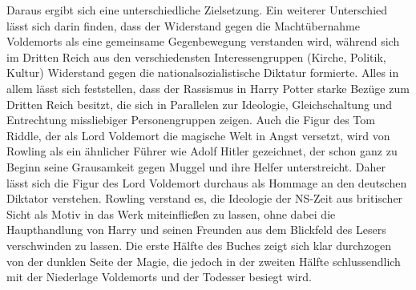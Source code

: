 Daraus ergibt sich eine unterschiedliche Zielsetzung.
Ein weiterer Unterschied lässt sich darin finden, dass der Widerstand gegen die Machtübernahme Voldemorts als eine gemeinsame Gegenbewegung verstanden wird, während sich im Dritten Reich aus den verschiedensten Interessengruppen (Kirche, Politik, Kultur) Widerstand gegen die nationalsozialistische Diktatur formierte.
Alles in allem lässt sich feststellen, dass der Rassismus in \glqq Harry Potter\grqq{} starke Bezüge zum Dritten Reich besitzt, die sich in Parallelen zur Ideologie, Gleichschaltung und Entrechtung missliebiger Personengruppen zeigen.
Auch die Figur des Tom Riddle, der als Lord Voldemort die magische Welt in Angst versetzt, wird von Rowling als ein ähnlicher \glqq Führer\grqq{} wie Adolf Hitler gezeichnet, der schon ganz zu Beginn seine Grausamkeit gegen Muggel und ihre Helfer unterstreicht.
Daher lässt sich die Figur des Lord Voldemort durchaus als Hommage an den deutschen Diktator verstehen.
Rowling verstand es, die Ideologie der NS-Zeit aus britischer Sicht als Motiv in das Werk miteinfließen zu lassen, ohne dabei die Haupthandlung von Harry und seinen Freunden aus dem Blickfeld des Lesers verschwinden zu lassen. 
Die erste Hälfte des Buches zeigt sich klar durchzogen von der dunklen Seite der Magie, die jedoch in der zweiten Hälfte schlussendlich mit der Niederlage Voldemorts und der Todesser besiegt wird.
